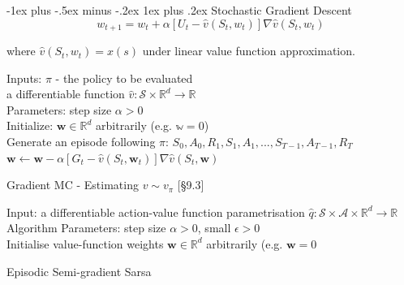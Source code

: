 \documentclass[10pt,landscape]{article}
\makeatletter
\renewcommand{\subsubsection}{\@startsection{subsubsection}{3}{0mm}%
                                {-1ex plus -.5ex minus -.2ex}%
                                {1ex plus .2ex}%
                                {\normalfont\small\bfseries}}
\makeatother
\begin{document}
\begin{multicols}{3}
\subsubsection{Stochastic Gradient Descent}
$$w_{t+1} = w_t + \alpha[U_t - \hat{v}(S_t, w_t)] \nabla \hat{v}(S_t, w_t)$$

where $\hat{v}(S_t, w_t) = x(s)$ under linear value function approximation.


\begin{algorithm}[H]
Inputs: $\pi$ - the policy to be evaluated \\
		a differentiable function $\hat{v} : \mathcal{S} \times \mathbb{R}^d \rightarrow \mathbb{R}$ \\
Parameters: step size $\alpha > 0$ \\
Initialize: $\mathbf{w} \in \mathbb{R}^d$ arbitrarily (e.g. $\mathbb{w} = 0$) \\
{
    Generate an episode following $\pi$: $S_0, A_0, R_1, S_1, A_1,..., S_{T-1}, A_{T-1}, R_T$\\
    {
		$\mathbf{w} \leftarrow \mathbf{w} - \alpha \left [ G_t - \hat{v}(S_t, \mathbf{w}_t) \right ] \nabla \hat{v}(S_t, \mathbf{w})$
    }
 }
\caption{Gradient MC - Estimating $v \sim v_{\pi}$ [§9.3]}
\end{algorithm}

\begin{algorithm}[H]
Input: a differentiable action-value function parametrisation $\hat{q}: \mathcal{S} \times \mathcal{A} \times \mathbb{R}^d \rightarrow \mathbb{R}$ \\
Algorithm Parameters: step size $\alpha > 0$, small $\epsilon > 0$ \\
Initialise value-function weights $\mathbf{w} \in \mathbb{R}^d$ arbitrarily (e.g. $\mathbf{w} = 0$ \\
\caption{Episodic Semi-gradient Sarsa}
\end{algorithm}



\end{multicols}
\end{document}
